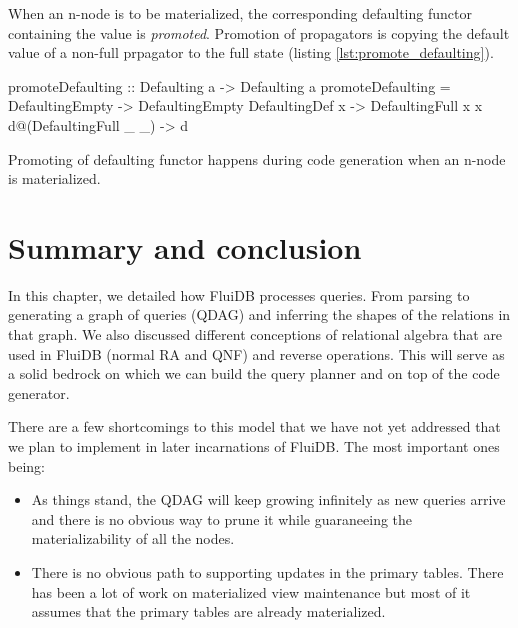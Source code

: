 When an n-node is to be materialized, the corresponding defaulting
functor containing the value is \emph{promoted}.  Promotion of
propagators is copying the default value of a non-full prpagator to
the full state (listing \ref{lst:promote_defaulting}).


\begin{code}
  \begin{haskellcode}
    promoteDefaulting :: Defaulting a -> Defaulting a
    promoteDefaulting = \case
      DefaultingEmpty        -> DefaultingEmpty
      DefaultingDef x        -> DefaultingFull x x
      d@(DefaultingFull _ _) -> d
  \end{haskellcode}

  \caption{\label{lst:promote_defaulting}Promoting of defaulting functor happens
    during code generation when an n-node is materialized.}
\end{code}

\section{Summary and conclusion}

In this chapter, we detailed how FluiDB processes queries. From
parsing to generating a graph of queries (QDAG) and inferring the
shapes of the relations in that graph. We also discussed different
conceptions of relational algebra that are used in FluiDB (normal RA
and QNF) and reverse operations. This will serve as a solid bedrock on
which we can build the query planner and on top of the code generator.

There are a few shortcomings to this model that we have not yet
addressed that we plan to implement in later incarnations of
FluiDB. The most important ones being:

\begin{itemize}
\item As things stand, the QDAG will keep growing infinitely as new
  queries arrive and there is no obvious way to prune it while
  guaraneeing the materializability of all the nodes.
\item There is no obvious path to supporting updates in the primary
  tables. There has been a lot of work on materialized view
  maintenance but most of it assumes that the primary tables are
  already materialized.
\end{itemize}
